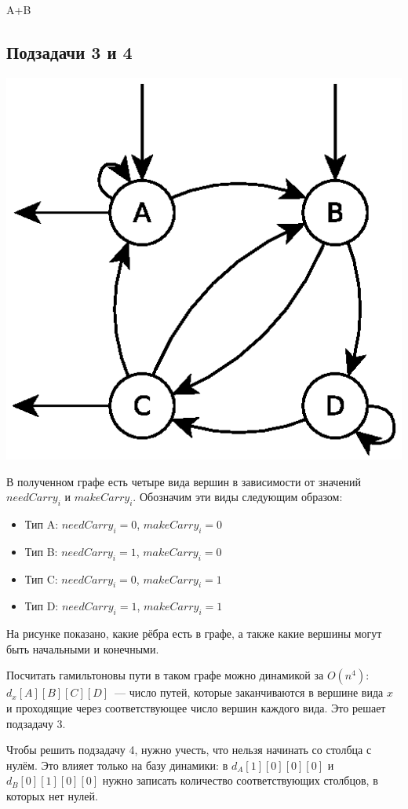 \begin{tutorial}{A+B}
\subsection*{Подзадачи 3 и 4}
\begin{center}
\includegraphics{tutor_graph.eps}
\end{center}
В полученном графе есть четыре вида вершин в зависимости от значений $needCarry_i$ и $makeCarry_i$. Обозначим эти виды следующим образом:
\begin{itemize}
\item Тип A: $needCarry_i=0$, $makeCarry_i=0$
\item Тип B: $needCarry_i=1$, $makeCarry_i=0$
\item Тип C: $needCarry_i=0$, $makeCarry_i=1$
\item Тип D: $needCarry_i=1$, $makeCarry_i=1$
\end{itemize}
На рисунке показано, какие рёбра есть в графе, а также какие вершины могут быть начальными и конечными.

Посчитать гамильтоновы пути в таком графе можно динамикой за $O(n^4)$: $d_x[A][B][C][D]$~--- число путей, которые заканчиваются в вершине вида $x$ и проходящие через соответствующее число вершин каждого вида. Это решает подзадачу 3.

Чтобы решить подзадачу 4, нужно учесть, что нельзя начинать со столбца с нулём. Это влияет только на базу динамики: в $d_A[1][0][0][0]$ и $d_B[0][1][0][0]$ нужно записать количество соответствующих столбцов, в которых нет нулей.



\end{tutorial}
